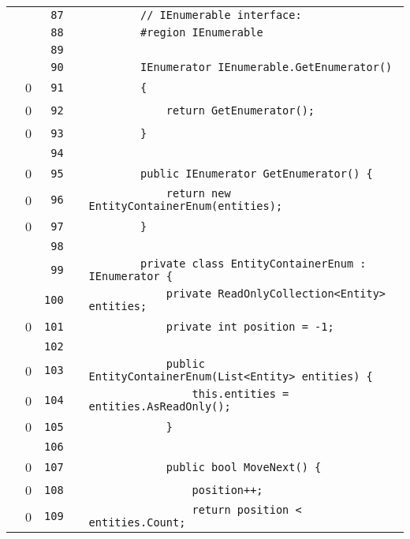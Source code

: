 \documentclass[a4paper,landscape,10pt]{article}
\begin{document}
\begin{longtable}[l]{lrrll}
\cellcolor{gray} &  & \verb~87~ & & \verb~        // IEnumerable interface:~\\
\cellcolor{gray} &  & \verb~88~ & & \verb~        #region IEnumerable~\\
\cellcolor{gray} &  & \verb~89~ & & \verb~~\\
\cellcolor{gray} &  & \verb~90~ & & \verb~        IEnumerator IEnumerable.GetEnumerator()~\\
\cellcolor{red} & 0 & \verb~91~ & & \verb~        {~\\
\cellcolor{red} & 0 & \verb~92~ & & \verb~            return GetEnumerator();~\\
\cellcolor{red} & 0 & \verb~93~ & & \verb~        }~\\
\cellcolor{gray} &  & \verb~94~ & & \verb~~\\
\cellcolor{red} & 0 & \verb~95~ & & \verb~        public IEnumerator GetEnumerator() {~\\
\cellcolor{red} & 0 & \verb~96~ & & \verb~            return new EntityContainerEnum(entities);~\\
\cellcolor{red} & 0 & \verb~97~ & & \verb~        }~\\
\cellcolor{gray} &  & \verb~98~ & & \verb~~\\
\cellcolor{gray} &  & \verb~99~ & & \verb~        private class EntityContainerEnum : IEnumerator {~\\
\cellcolor{gray} &  & \verb~100~ & & \verb~            private ReadOnlyCollection<Entity> entities;~\\
\cellcolor{red} & 0 & \verb~101~ & & \verb~            private int position = -1;~\\
\cellcolor{gray} &  & \verb~102~ & & \verb~~\\
\cellcolor{red} & 0 & \verb~103~ & & \verb~            public EntityContainerEnum(List<Entity> entities) {~\\
\cellcolor{red} & 0 & \verb~104~ & & \verb~                this.entities = entities.AsReadOnly();~\\
\cellcolor{red} & 0 & \verb~105~ & & \verb~            }~\\
\cellcolor{gray} &  & \verb~106~ & & \verb~~\\
\cellcolor{red} & 0 & \verb~107~ & & \verb~            public bool MoveNext() {~\\
\cellcolor{red} & 0 & \verb~108~ & & \verb~                position++;~\\
\cellcolor{red} & 0 & \verb~109~ & & \verb~                return position < entities.Count;~\\

\end{longtable}
\end{document}
